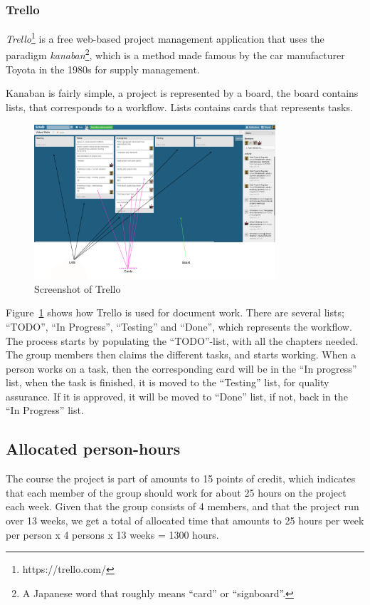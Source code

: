\documentclass[11pt]{book}
\begin{document}
\subsubsection{Trello}
\emph{Trello}\footnote{https://trello.com/} is a free web-based project management application that uses the paradigm \emph{kanaban}\footnote{A Japanese word that roughly means ``card'' or ``signboard''.}, which is a method made famous by the car manufacturer Toyota in the 1980s for supply management. 

Kanaban is fairly simple, a project is represented by a board, the board contains lists, that corresponds to a workflow. Lists contains cards that represents tasks.

\begin{figure}[H]
      \centering
      \includegraphics[width=0.8\textwidth]{Figures/trello.png}
      \caption{Screenshot of Trello}
      \label{fig:tools_trello}
\end{figure}

Figure~\ref{fig:tools_trello} shows how Trello is used for document work. There are several lists; ``TODO'', ``In Progress'', ``Testing'' and ``Done'', which represents the workflow. The process starts by populating the ``TODO''-list, with all the chapters needed. The group members then claims the different tasks, and starts working. When a person works on a task, then the corresponding card will be in the ``In progress'' list, when the task is finished, it is moved to the ``Testing'' list, for quality assurance. If it is approved, it will be moved to ``Done'' list, if not, back in the ``In Progress'' list.

\subsection{Allocated person-hours}
The course the project is part of amounts to 15 points of credit, which indicates that each member of the group should work for about 25 hours on the project each week. Given that the group consists of 4 members, and that the project run over 13 weeks, we get a total of allocated time that amounts to 25 hours per week per person x 4 persons x 13 weeks = 1300 hours.
\end{document}
